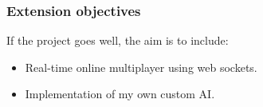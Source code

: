 \documentclass{article}
\begin{document}
\subsubsection{Extension objectives}

If the project goes well, the aim is to include:
\begin{itemize}
    \renewcommand\labelitemi{--}
    \item Real-time online multiplayer using web sockets.
    \item Implementation of my own custom AI.
\end{itemize} 
\end{document}
